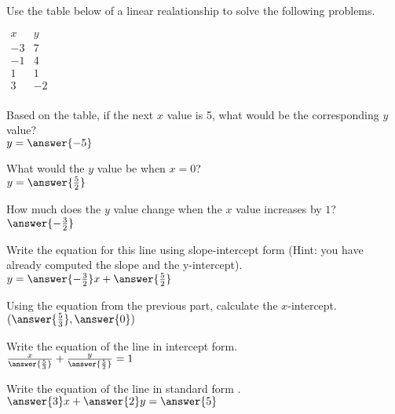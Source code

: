 \documentclass{ximera}
\author{David Kish}
\begin{document}
Use the table below of a linear realationship to solve the following problems.
\begin{center}
$\begin{array}{r|r}
x&y\\
\hline
-3&7\\
-1&4\\
1&1\\
3&-2\\
\end{array}$
\end{center}
\begin{exercise}
Based on the table, if the next $x$ value is 5, what would be the corresponding $y$ value?\\
$y =\answer{-5}$
\end{exercise}
\begin{exercise}
What would the $y$ value be when $x=0$?\\
$y=\answer{\frac{5}{2}}$
\end{exercise}
\begin{exercise}
How much does the $y$ value change when the $x$ value increases by $1$?\\
$\answer{-\frac{3}{2}}$
\end{exercise}
\begin{exercise}
Write the equation for this line using slope-intercept form (Hint: you have already computed the slope and the y-intercept).\\
$y=\answer{-\frac{3}{2}}x+\answer{\frac{5}{2}}$
\end{exercise}
\begin{exercise}
Using the equation from the previous part, calculate the $x$-intercept.\\
$(\answer{\frac{5}{3}},\answer{0})$
\end{exercise}
\begin{exercise}
Write the equation of the line in intercept form.\\
$\frac{x}{\answer{\frac{5}{3}}}+\frac{y}{\answer{\frac{5}{2}}}=1$
\end{exercise}
\begin{exercise}
Write the equation of the line in standard form .\\
$\answer{3}x+\answer{2}y=\answer{5}$
\end{exercise}
\end{document}
